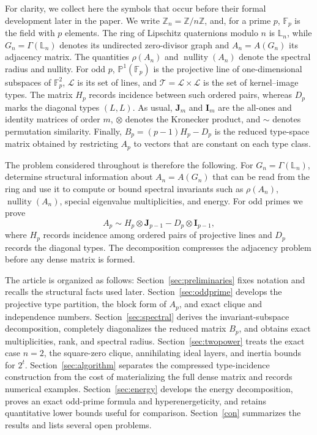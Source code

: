 \documentclass[12pt]{article}
\theoremstyle{definition}
\newcommand{\Z}{\mathbb{Z}}
\newcommand{\F}{\mathbb{F}}
\newcommand{\LL}{\mathbb{L}}
\newcommand{\PP}{\mathbb{P}}
\newcommand{\calL}{\mathcal{L}}
\newcommand{\calT}{\mathcal{T}}
\newcommand{\I}{\mathbf{I}}
\newcommand{\J}{\mathbf{J}}
\newcommand{\nullity}{\operatorname{nullity}}
\begin{document}
	For clarity, we collect here the symbols that occur before their formal development later in the paper. We write $\Z_n=\mathbb Z/n\mathbb Z$, and, for a prime $p$, $\F_p$ is the field with $p$ elements. The ring of Lipschitz quaternions modulo $n$ is $\LL_n$, while $G_n=\Gamma(\LL_n)$ denotes its undirected zero-divisor graph and $A_n=A(G_n)$ its adjacency matrix. The quantities $\rho(A_n)$ and $\nullity(A_n)$ denote the spectral radius and nullity. For odd $p$, $\PP^1(\F_p)$ is the projective line of one-dimensional subspaces of $\F_p^2$, $\calL$ is its set of lines, and $\calT=\calL\times\calL$ is the set of kernel--image types. The matrix $H_p$ records incidence between such ordered pairs, whereas $D_p$ marks the diagonal types $(L,L)$. As usual, $\J_m$ and $\I_m$ are the all-ones and identity matrices of order $m$, $\otimes$ denotes the Kronecker product, and $\sim$ denotes permutation similarity. Finally, $B_p=(p-1)H_p-D_p$ is the reduced type-space matrix obtained by restricting $A_p$ to vectors that are constant on each type class.
	
	The problem considered throughout is therefore the following. For $G_n=\Gamma(\LL_n)$, determine structural information about $A_n=A(G_n)$ that can be read from the ring and use it to compute or bound spectral invariants such as $\rho(A_n)$, $\nullity(A_n)$, special eigenvalue multiplicities, and energy. For odd primes we prove
	$$
	A_p\sim H_p\otimes \J_{p-1}-D_p\otimes \I_{p-1},
	$$
	where $H_p$ records incidence among ordered pairs of projective lines and $D_p$ records the diagonal types. The decomposition compresses the adjacency problem before any dense matrix is formed.
	
	\medskip
	The article is organized as follows: Section~\ref{sec:preliminaries} fixes notation and recalls the structural facts used later. Section~\ref{sec:oddprime} develops the projective type partition, the block form of $A_p$, and exact clique and independence numbers. Section~\ref{sec:spectral} derives the invariant-subspace decomposition, completely diagonalizes the reduced matrix $B_p$, and obtains exact multiplicities, rank, and spectral radius. Section~\ref{sec:twopower} treats the exact case $n=2$, the square-zero clique, annihilating ideal layers, and inertia bounds for $2^t$. Section~\ref{sec:algorithm} separates the compressed type-incidence construction from the cost of materializing the full dense matrix and records numerical examples. Section~\ref{sec:energy} develops the energy decomposition, proves an exact odd-prime formula and hyperenergeticity, and retains quantitative lower bounds useful for comparison. Section~\ref{con} summarizes the results and lists several open problems.
	
\end{document}
